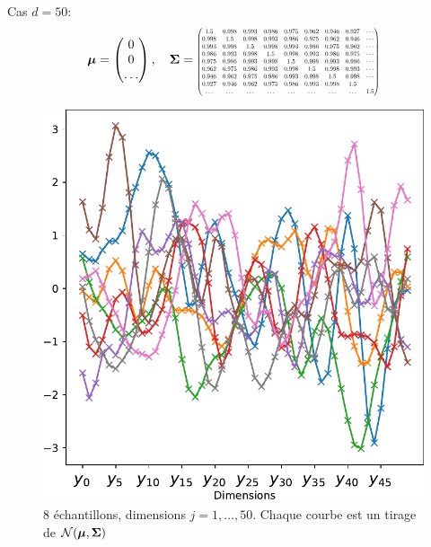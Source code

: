 \documentclass[xcolor=svgnames, t]{beamer}
\newcommand{\vectorx}[1]{\boldsymbol{\MakeLowercase{\mathbf{#1}}}}
\newcommand{\matrixx}[1]{\boldsymbol{\MakeUppercase{#1}}}
\newcommand{\scalemath}[2]{\scalebox{#1}{\mbox{\ensuremath{\displaystyle #2}}}}
\begin{document}
\begin{frame}{\subsecname}
  Cas $d=50$:%
  \begin{equation*}
    \vectorx{\mu}
    =
    \begin{pmatrix}
      0 \\
      0 \\
      \dots
    \end{pmatrix},
    \quad
    \matrixx{\Sigma}
    =
    \scalemath{0.5}{
      \begin{pmatrix}
        1.5 & 0.998 & 0.993 & 0.986 & 0.975 & 0.962 & 0.946 & 0.927 & \cdots \\
        0.998 & 1.5 & 0.998 & 0.993 & 0.986 & 0.975 & 0.962 & 0.946 & \cdots \\
        0.993 & 0.998 & 1.5 & 0.998 & 0.993 & 0.986 & 0.975 & 0.962 & \cdots \\
        0.986 & 0.993 & 0.998 & 1.5 & 0.998 & 0.993 & 0.986 & 0.975 & \cdots \\
        0.975 & 0.986 & 0.993 & 0.998 & 1.5 & 0.998 & 0.993 & 0.986 & \cdots \\
        0.962 & 0.975 & 0.986 & 0.993 & 0.998 & 1.5 & 0.998 & 0.993 & \cdots \\
        0.946 & 0.962 & 0.975 & 0.986 & 0.993 & 0.998 & 1.5 & 0.998 & \cdots \\
        0.927 & 0.946 & 0.962 & 0.975 & 0.986 & 0.993 & 0.998 & 1.5   \\
        \hdots & \hdots & \hdots & \hdots & \hdots & \hdots & \hdots & \hdots & 1.5
      \end{pmatrix}
    }
  \end{equation*}%
  \begin{figure}[h]
    \includegraphics[scale=0.4]{gaussian_50d_valuevsindex.pdf}%
    \caption{$8$ échantillons, dimensions $j=1, \dots, 50$.
    Chaque courbe est un tirage de $\mathcal{N}(\vectorx{\mu} , \matrixx{\Sigma})$}
  \end{figure}
\end{frame}
%
\end{document}
